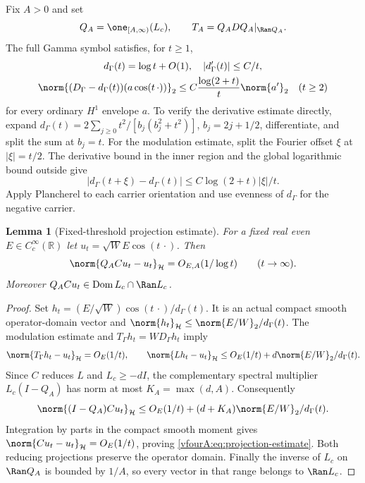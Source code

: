 \documentclass[11pt,a4paper]{article}
\numberwithin{equation}{section}
\newtheorem{lemma}[theorem]{Lemma}
\theoremstyle{definition}\newtheorem{definition}[theorem]{Definition}
\theoremstyle{remark}\newtheorem{remark}[theorem]{Remark}
\newcommand{\R}{\mathbb R}\newcommand{\C}{\mathbb C}\newcommand{\N}{\mathbb N}
\newcommand{\Hh}{\mathcal H}\newcommand{\Hw}{\mathcal H}
\newcommand{\dom}{\operatorname{Dom}}\newcommand{\Var}{\operatorname{Var}}
\begin{document}
Fix $A>0$ and set
\begin{equation}\label{vfourA:eq:positive-range}
 Q_A=\one_{[A,\infty)}(L_c),\qquad
 T_A=Q_ADQ_A|_{\Ran Q_A}.
\end{equation}
The full Gamma symbol satisfies, for $t\ge1$,
\begin{equation}\label{vfourA:eq:modulation}
 \begin{gathered}
 d_\Gamma(t)=\log t+O(1),\quad |d_\Gamma'(t)|\le C/t,
 \\
 \norm{(D_\Gamma-d_\Gamma(t))(a\cos(t\,\cdot))}_2
 \le C\frac{\log(2+t)}t\norm{a'}_2\quad(t\ge2)
 \end{gathered}
\end{equation}
for every ordinary $H^1$ envelope $a$.
To verify the derivative estimate directly, expand
$d_\Gamma(t)=2\sum_{j\ge0}t^2/[b_j(b_j^2+t^2)]$,
$b_j=2j+1/2$, differentiate, and split the sum at $b_j=t$.
For the modulation estimate, split the Fourier offset $\xi$ at
$|\xi|=t/2$.  The derivative bound in the inner region and the
global logarithmic bound outside give
\[
 |d_\Gamma(t+\xi)-d_\Gamma(t)|
 \le C\log(2+t)|\xi|/t.
\]
Apply Plancherel to each carrier orientation and use evenness of
$d_\Gamma$ for the negative carrier.

\begin{lemma}[Fixed-threshold projection estimate]
\label{vfourA:lem:projection}
For a fixed real even $E\in C_c^\infty(\R)$ let
$u_t=\sqrt W E\cos(t\,\cdot)$.  Then
\begin{equation}\label{vfourA:eq:projection-estimate}
 \norm{Q_ACu_t-u_t}_{\Hh}=O_{E,A}(1/\log t)
 \qquad(t\to\infty).
\end{equation}
Moreover $Q_ACu_t\in\dom L_c\cap\Ran L_c$.
\end{lemma}
\begin{proof}
Set $h_t=(E/\sqrt W)\cos(t\,\cdot)/d_\Gamma(t)$.
It is an actual compact smooth operator-domain vector and
$\norm{h_t}_{\Hh}\le\norm{E/W}_2/d_\Gamma(t)$.
The modulation estimate and $T_\Gamma h_t=WD_\Gamma h_t$ imply
\[
 \norm{T_\Gamma h_t-u_t}_{\Hh}=O_E(1/t),\qquad
 \norm{Lh_t-u_t}_{\Hh}
 \le O_E(1/t)+d\norm{E/W}_2/d_\Gamma(t).
\]
Since $C$ reduces $L$ and $L_c\ge-dI$, the complementary spectral
multiplier $L_c(I-Q_A)$ has norm at most $K_A=\max(d,A)$.
Consequently
\[
 \norm{(I-Q_A)Cu_t}_{\Hh}
 \le O_E(1/t)+(d+K_A)\norm{E/W}_2/d_\Gamma(t).
\]
Integration by parts in the compact smooth moment gives
$\norm{Cu_t-u_t}_{\Hh}=O_E(1/t)$, proving
\eqref{vfourA:eq:projection-estimate}.  Both reducing projections
preserve the operator domain.  Finally the inverse of $L_c$ on
$\Ran Q_A$ is bounded by $1/A$, so every vector in that range
belongs to $\Ran L_c$.
\end{proof}
\end{document}
